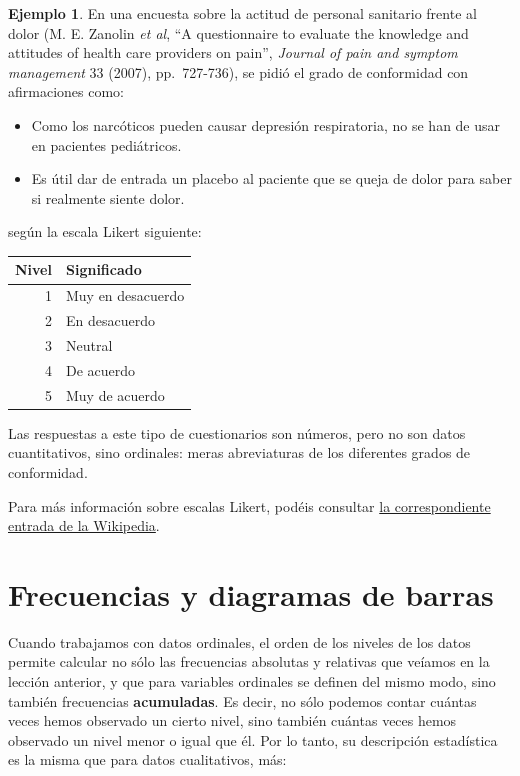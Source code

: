 \documentclass[
]{book}
\theoremstyle{definition}
\theoremstyle{definition}
\newtheorem{example}{Ejemplo}[chapter]
\theoremstyle{definition}
\theoremstyle{definition}
\theoremstyle{remark}
\begin{document}
\begin{example}
\protect\hypertarget{exm:likert}{}\label{exm:likert}En una encuesta sobre la actitud de personal sanitario frente al dolor (M. E. Zanolin \emph{et al}, ``A questionnaire to evaluate the knowledge and attitudes of health care providers on pain'', \emph{Journal of pain and symptom management} 33 (2007), pp.~727-736), se pidió el grado de conformidad con afirmaciones como:

\begin{itemize}
\item
  Como los narcóticos pueden causar depresión respiratoria, no se han de usar en pacientes pediátricos.
\item
  Es útil dar de entrada un placebo al paciente que se queja de dolor para saber si realmente siente dolor.
\end{itemize}

según la escala Likert siguiente:
\end{example}

\begin{tabular}{r|l}
\hline
Nivel & Significado\\
\hline
1 & Muy en desacuerdo\\
\hline
2 & En desacuerdo\\
\hline
3 & Neutral\\
\hline
4 & De acuerdo\\
\hline
5 & Muy de acuerdo\\
\hline
\end{tabular}

Las respuestas a este tipo de cuestionarios son números, pero no son datos cuantitativos, sino ordinales: meras abreviaturas de los diferentes grados de conformidad.

Para más información sobre escalas Likert, podéis consultar \href{http://es.wikipedia.org/wiki/Escalas_Likert}{la correspondiente entrada de la Wikipedia}.

\hypertarget{frecuencias-y-diagramas-de-barras}{%
\section{Frecuencias y diagramas de barras}\label{frecuencias-y-diagramas-de-barras}}

Cuando trabajamos con datos ordinales, el orden de los niveles de los datos permite calcular no sólo las frecuencias absolutas y relativas que veíamos en la lección anterior, y que para variables ordinales se definen del mismo modo, sino también frecuencias \textbf{acumuladas}. Es decir, no sólo podemos contar cuántas veces hemos observado un cierto nivel, sino también cuántas veces hemos observado un nivel menor o igual que él. Por lo tanto, su descripción estadística es la misma que para datos cualitativos, más:
\end{document}
